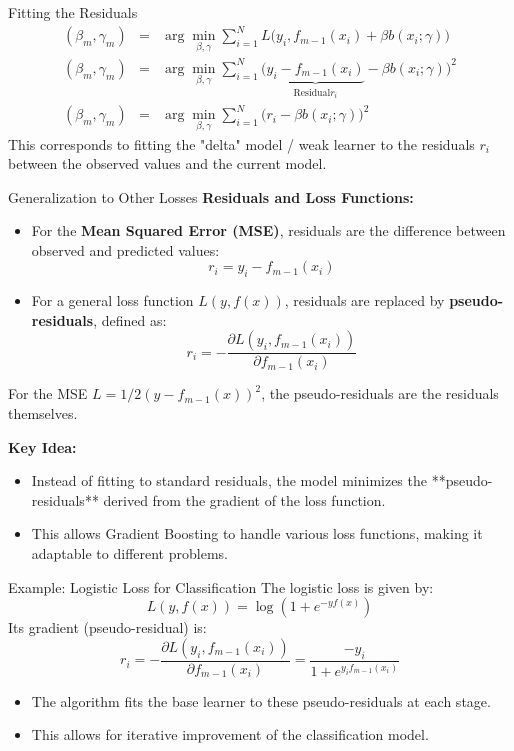 \documentclass{beamer}
\begin{document}
\begin{frame}{Fitting the Residuals}
    \begin{eqnarray}
        (\beta_m, \gamma_m) &=& \arg\min_{\beta, \gamma} \sum_{i=1}^N L\Big( y_i , f_{m-1}(x_i) + \beta b(x_i; \gamma)\Big) \nonumber \\
        (\beta_m, \gamma_m) &=& \arg\min_{\beta, \gamma} \sum_{i=1}^N \Big( \underbrace{y_i - f_{m-1}(x_i)}_{\text{Residual} r_i} - \beta b(x_i; \gamma)\Big)^2 \nonumber \\
        (\beta_m, \gamma_m) &=& \arg\min_{\beta, \gamma} \sum_{i=1}^N \Big( r_i - \beta b(x_i; \gamma)\Big)^2 
    \end{eqnarray}
    This corresponds to fitting the "delta" model / weak learner to the residuals $r_i$ between the observed values and the current model.
\end{frame}

\begin{frame}{Generalization to Other Losses}
    \textbf{Residuals and Loss Functions:}
    \begin{itemize}
        \item For the \textbf{Mean Squared Error (MSE)}, residuals are the difference between observed and predicted values:
        \[
        r_i = y_i - f_{m-1}(x_i)
        \]
        \item For a general loss function \(L(y, f(x))\), residuals are replaced by \textbf{pseudo-residuals}, defined as:
        \[
        r_i = -\frac{\partial L(y_i, f_{m-1}(x_i))}{\partial f_{m-1}(x_i)}
        \]
    \end{itemize}
   
    For the MSE $L = 1/2 (y - f_{m-1}(x))^2$, the pseudo-residuals are the residuals themselves.
    
    \textbf{Key Idea:}
    \begin{itemize}
        \item Instead of fitting to standard residuals, the model minimizes the **pseudo-residuals** derived from the gradient of the loss function.
        \item This allows Gradient Boosting to handle various loss functions, making it adaptable to different problems.
    \end{itemize}
    
\end{frame}

\begin{frame}{Example: Logistic Loss for Classification}
    The logistic loss is given by:
    \[ 
    L(y, f(x)) = \log(1 + e^{-y f(x)})
    \]
    Its gradient (pseudo-residual) is:
    \[
    r_i = -\frac{\partial L(y_i, f_{m-1}(x_i))}{\partial f_{m-1}(x_i)} = \frac{-y_i}{1 + e^{y_i f_{m-1}(x_i)}}
    \]
    \begin{itemize}
        \item The algorithm fits the base learner to these pseudo-residuals at each stage.
        \item This allows for iterative improvement of the classification model.
    \end{itemize}
\end{frame}
\end{document}
